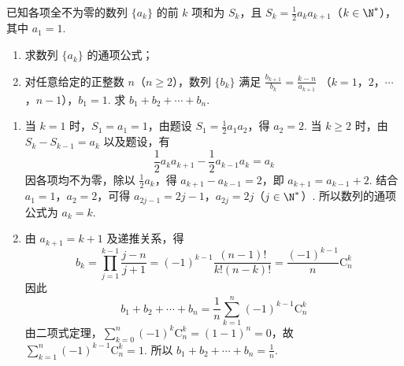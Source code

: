 \begin{problem}
已知各项全不为零的数列 \(\{a_{k}\}\) 的前 \(k\) 项和为 \(S_{k}\)，且 \(S_{k} = \frac{1}{2} a_{k} a_{k + 1}\)（\(k \in \N^*\)），其中 \(a_{1} = 1\).
\begin{enumerate}
\item 求数列 \( \{a_{k}\} \) 的通项公式；
\item 对任意给定的正整数 \(n\)（\(n \geqslant 2\)），数列 \(\{b_k\}\) 满足 \(\frac{b_{k+1}}{b_k} = \frac{k-n}{a_{k+1}}\) （\(k = 1\)，\(2\)，\(\cdots\)，\(n-1\)），\(b_1 = 1\). 求 \(b_1 + b_2 + \cdots + b_n\).
\end{enumerate}
\end{problem}

\begin{solution}
\begin{enumerate}
\item 当 \(k=1\) 时，\(S_1=a_1=1\)，由题设 \(S_1=\frac{1}{2}a_1a_2\)，得 \(a_2=2\). 当 \(k\geqslant2\) 时，由 \(S_k-S_{k-1}=a_k\) 以及题设，有
\[
\frac{1}{2}a_ka_{k+1}-\frac{1}{2}a_{k-1}a_k=a_k
\]
因各项均不为零，除以 \(\frac{1}{2}a_k\)，得 \(a_{k+1}-a_{k-1}=2\)，即 \(a_{k+1}=a_{k-1}+2\). 结合 \(a_1=1\)，\(a_2=2\)，可得
\(a_{2j-1}=2j-1\)，\(a_{2j}=2j\)（\(j\in\N^*\)）.
所以数列的通项公式为 \(a_k=k\).
\item 由 \(a_{k+1}=k+1\) 及递推关系，得
\[
b_k=\prod_{j=1}^{k-1}\frac{j-n}{j+1}
=(-1)^{k-1}\frac{(n-1)!}{k!(n-k)!}
=\frac{(-1)^{k-1}}{n}\mathrm C_n^k
\]
因此
\[
b_1+b_2+\cdots+b_n=\frac{1}{n}\sum_{k=1}^n(-1)^{k-1}\mathrm C_n^k
\]
由二项式定理，\(\sum_{k=0}^n(-1)^k\mathrm C_n^k=(1-1)^n=0\)，故 \(\sum_{k=1}^n(-1)^{k-1}\mathrm C_n^k=1\). 所以 \(b_1+b_2+\cdots+b_n=\frac{1}{n}\).
\end{enumerate}
\end{solution}
